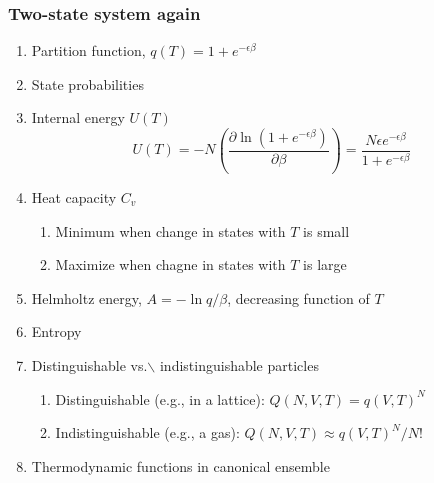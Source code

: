 \documentclass[11pt]{article}
\begin{document}
\subsubsection{Two-state system again}
\label{sec:orgae8327c}
\begin{enumerate}
\item Partition function, \(q(T)=1+e^{-\epsilon\beta}\)
\item State probabilities
\item Internal energy \(U(T)\)
\begin{equation}
  U(T)=-N \left ( \frac{\partial \ln(1+e^{-\epsilon\beta})}{\partial\beta}
  \right)=\frac{N\epsilon e^{-\epsilon\beta}}{1+e^{-\epsilon\beta}}
\end{equation}
\item Heat capacity \(C_v\)
\begin{enumerate}
\item Minimum when change in states with \(T\) is small
\item Maximize when chagne in states with \(T\) is large
\end{enumerate}
\item Helmholtz energy, \(A= -\ln q/\beta\), decreasing function of \(T\)
\item Entropy
\item Distinguishable vs.$\backslash$ indistinguishable particles
\begin{enumerate}
\item Distinguishable (e.g., in a lattice): \(Q(N,V,T) = q(V,T)^N\)
\item Indistinguishable (e.g., a gas): \(Q(N,V,T)\approx q(V,T)^N/N!\)
\end{enumerate}
\item Thermodynamic functions in canonical ensemble
\end{enumerate}
\end{document}
